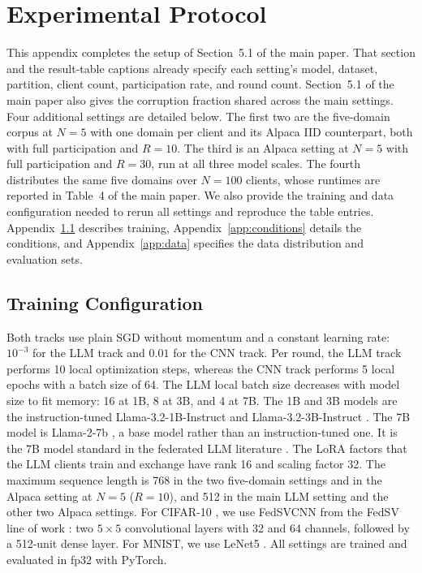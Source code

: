\documentclass[letterpaper]{article} %
\theoremstyle{definition}
\begin{document}
\section{Experimental Protocol}
\label{app:protocol}

This appendix completes the setup of Section~5.1 of the main paper. That
section and the result-table captions already specify each setting's model,
dataset, partition, client count, participation rate, and round count.
Section~5.1 of the main paper also gives the corruption fraction shared across the main
settings. Four additional settings are detailed below. The
first two are the five-domain corpus at $N{=}5$ with one domain per client and
its Alpaca IID counterpart, both with full participation and $R{=}10$. The
third is an Alpaca setting at $N{=}5$ with full participation and $R{=}30$, run
at all three model scales. The fourth distributes the same five domains over
$N{=}100$ clients, whose runtimes are reported in Table~4 of the main paper. We
also provide the training and data configuration needed to rerun all settings
and reproduce the table entries.
Appendix~\ref{app:train} describes training,
Appendix~\ref{app:conditions} details the conditions, and
Appendix~\ref{app:data} specifies the data distribution and evaluation sets.

\subsection{Training Configuration}
\label{app:train}

Both tracks use plain SGD without momentum and a constant learning rate:
$10^{-3}$ for the LLM track and $0.01$ for the CNN track. Per round, the LLM
track performs 10 local optimization steps, whereas the CNN track performs 5
local epochs with a batch size of 64. The LLM local batch size decreases with
model size to fit memory: 16 at 1B, 8 at 3B, and 4 at 7B. The 1B and 3B models
are the instruction-tuned Llama-3.2-1B-Instruct and
Llama-3.2-3B-Instruct \citep{grattafiori2024llama}. The 7B model is
Llama-2-7b \citep{touvron2023llama}, a base model rather than an
instruction-tuned one. It is the 7B model standard in the federated LLM literature
\citep{ye2024openfedllm}. The LoRA \citep{hu2022lora} factors that the LLM
clients train and exchange have rank 16 and scaling factor 32.
The maximum sequence length is 768 in the two five-domain settings and in the
Alpaca setting at $N{=}5$ ($R{=}10$), and 512 in the main LLM setting and the
other two Alpaca settings.
For CIFAR-10 \citep{krizhevsky2009learning}, we use FedSVCNN from the FedSV
line of work \citep{wang2020principled}: two
$5{\times}5$ convolutional layers with 32 and 64 channels, followed by a
512-unit dense layer. For MNIST, we use LeNet5 \citep{lecun1998gradient}. All
settings are trained and evaluated in fp32 with PyTorch.
\end{document}
